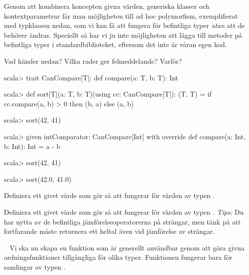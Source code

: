 Genom att kombinera koncepten givna värden, generiska klasser och kontextparametrar får man möjligheten till ad hoc polymorfism, exemplifierat med typklassen  nedan, som vi kan få att fungera för befintliga typer \emph{utan} att de behöver ändras. Speciellt så har vi ju inte möjligheten att lägga till metoder på befintliga typer i standardbiblioteket, eftersom det inte är våran egen kod.


\Subtask 
Vad händer nedan? Vilka rader ger felmeddelande? Varför?

\begin{REPL}
scala> trait CanCompare[T]:
         def compare(a: T, b: T): Int

scala> def sort[T](a: T, b: T)(using cc: CanCompare[T]): (T, T) =
         if cc.compare(a, b) > 0 then (b, a) else (a, b)

scala> sort(42, 41)

scala> given intComparator: CanCompare[Int] with
         override def compare(a: Int, b: Int): Int = a - b

scala> sort(42, 41)

scala> sort(42.0, 41.0)
\end{REPL}

\Subtask Definiera ett givet värde som gör så att  fungerar för värden av typen .

\Subtask Definiera ett givet värde som gör så att  fungerar för värden av typen . \emph{Tips:} Du har nytta av de befintliga jämförelseoperatorerna på strängar, men tänk på att  fortfarande måste returnera ett heltal även vid jämförelse av strängar.


\SOLUTION


\TaskSolved \what

\SubtaskSolved \TODO


\SubtaskSolved \TODO


\SubtaskSolved \TODO

\QUESTEND






\QUESTBEGIN

\Task \label{task:implicit-ordering} \what~  Vi ska nu skapa en funktion  som är generellt användbar genom att göra givna ordningsfunktioner tillgängliga för olika typer. Funktionen   fungerar bara för samlingar av typen .

